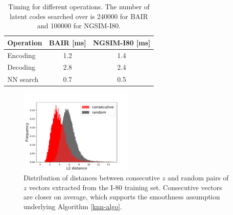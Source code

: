 \documentclass{article}
\begin{document}
\begin{table}
  \caption{Timing for different operations. The number of latent codes searched over is 240000 for BAIR and 100000 for NGSIM-I80. }
  \label{nn-search-timing}
  \centering
  \begin{tabular}{lcc}
    \toprule
    Operation     & BAIR [ms] & NGSIM-I80 [ms] \\
    \midrule
    Encoding  & 1.2 & 1.4 \\
    Decoding  & 2.8 & 2.4 \\
    NN search & 0.7 & 0.5 \\
    \bottomrule
  \end{tabular}
\end{table}

\begin{figure}
  \centering
  \includegraphics[width=0.5\textwidth]{images/distance_histograms.pdf}
  \caption{Distribution of distances between consecutive $z$ and random pairs of $z$ vectors extracted from the I-80 training set. Consecutive vectors are closer on average, which supports the smoothness assumption underlying Algorithm \ref{knn-algo}.}
\end{figure}


%
%
\end{document}
